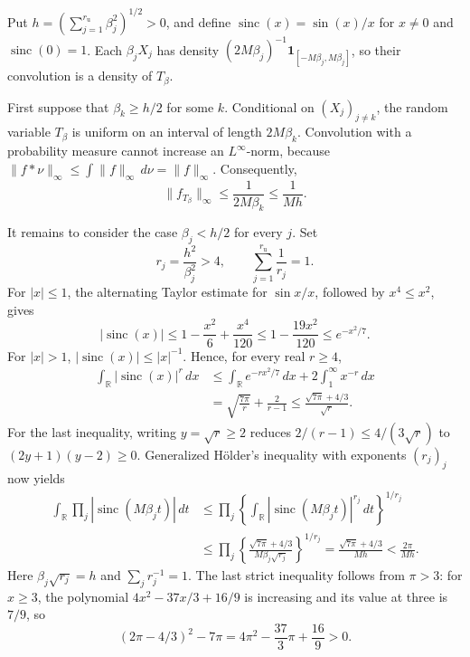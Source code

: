 Put \(h=(\sum_{j=1}^{r_{\mathrm u}}\beta_j^2)^{1/2}>0\), and define \(\operatorname{sinc}(x)=\sin(x)/x\) for \(x\ne0\) and \(\operatorname{sinc}(0)=1\).  Each \(\beta_jX_j\) has density \((2M\beta_j)^{-1}\mathbf 1_{[-M\beta_j,M\beta_j]}\), so their convolution is a density of \(T_\beta\).

First suppose that \(\beta_k\ge h/2\) for some \(k\).  Conditional on \((X_j)_{j\ne k}\), the random variable \(T_\beta\) is uniform on an interval of length \(2M\beta_k\).  Convolution with a probability measure cannot increase an \(L^\infty\)-norm, because \(\|f*\nu\|_\infty\le\int\|f\|_\infty\,d\nu=\|f\|_\infty\).  Consequently,
\[
 \|f_{T_\beta}\|_\infty
 \le \frac{1}{2M\beta_k}
 \le \frac{1}{Mh}.
\]

It remains to consider the case \(\beta_j<h/2\) for every \(j\).  Set
\[
 r_j=\frac{h^2}{\beta_j^2}>4,
 \qquad
 \sum_{j=1}^{r_{\mathrm u}}\frac1{r_j}=1.
\]
For \(|x|\le1\), the alternating Taylor estimate for \(\sin x/x\), followed by \(x^4\le x^2\), gives
\[
 |\operatorname{sinc}(x)|
 \le 1-\frac{x^2}{6}+\frac{x^4}{120}
 \le 1-\frac{19x^2}{120}
 \le e^{-x^2/7}.
\]
For \(|x|>1\), \(|\operatorname{sinc}(x)|\le |x|^{-1}\).  Hence, for every real \(r\ge4\),
\[
 \begin{aligned}
 \int_{\mathbb R}|\operatorname{sinc}(x)|^r\,dx
 &\le \int_{\mathbb R}e^{-rx^2/7}\,dx
       +2\int_1^\infty x^{-r}\,dx \\
 &=\sqrt{\frac{7\pi}{r}}+\frac{2}{r-1}
 \le \frac{\sqrt{7\pi}+4/3}{\sqrt r}.
 \end{aligned}
\]
For the last inequality, writing \(y=\sqrt r\ge2\) reduces \(2/(r-1)\le4/(3\sqrt r)\) to \((2y+1)(y-2)\ge0\).  Generalized H\"older's inequality with exponents \((r_j)_j\) now yields
\[
 \begin{aligned}
 \int_{\mathbb R}\prod_j
       |\operatorname{sinc}(M\beta_jt)|\,dt
 &\le \prod_j
   \left\{\int_{\mathbb R}
   |\operatorname{sinc}(M\beta_jt)|^{r_j}\,dt\right\}^{1/r_j} \\
 &\le \prod_j
   \left\{\frac{\sqrt{7\pi}+4/3}
   {M\beta_j\sqrt{r_j}}\right\}^{1/r_j}
 =\frac{\sqrt{7\pi}+4/3}{Mh}
 <\frac{2\pi}{Mh}.
 \end{aligned}
\]
Here \(\beta_j\sqrt{r_j}=h\) and \(\sum_jr_j^{-1}=1\).  The last strict inequality follows from \(\pi>3\): for \(x\ge3\), the polynomial \(4x^2-37x/3+16/9\) is increasing and its value at three is \(7/9\), so
\[
 (2\pi-4/3)^2-7\pi
 =4\pi^2-\frac{37}{3}\pi+\frac{16}{9}>0.
\]

